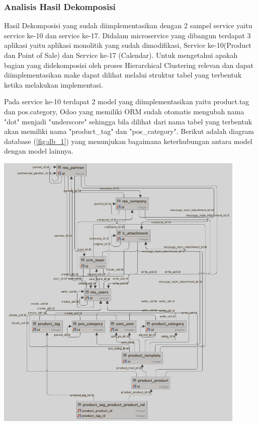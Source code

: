 
\subsubsection{Analisis Hasil Dekomposisi}
Hasil Dekomposisi yang sudah diimplementasikan dengan 2 sampel service yaitu service ke-10 dan service ke-17. Didalam microservice yang dibangun terdapat 3 aplikasi yaitu aplikasi monolitik yang sudah dimodifikasi, Service ke-10(Product dan Point of Sale) dan Service ke-17 (Calendar). Untuk mengetahui apakah bagian yang didekomposisi oleh proses Hierarchical Clustering relevan dan dapat diimplementasikan make dapat dilihat melalui struktur tabel yang terbentuk ketika melakukan implementasi.

Pada service ke-10 terdapat 2 model yang diimplementasikan yaitu product.tag dan pos.category, Odoo yang memiliki ORM sudah otomatis mengubah nama "dot" menjadi "underscore" sehingga bila dilihat dari nama tabel yang terbentuk akan memiliki nama "product\_tag" dan "pos\_category". Berikut adalah diagram database (\ref{fig:db_1})  yang menunjukan bagaimana keterhubungan antara model dengan model lainnya. 

\begin{center}
	\includegraphics[width=12cm]{img/bab_4/db_1.png}
	\label{fig:db_1}
\end{center}

